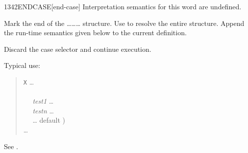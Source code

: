 \vspace*{-1.5ex}\enlargethispage{8ex}
\begin{worddef}{1342}{ENDCASE}[end-case]
\interpret
	Interpretation semantics for this word are undefined.

\compile

	Mark the end of the
	\ldots{}\ldots{}\ldots{}
	structure. Use  to resolve the entire structure.
	Append the run-time semantics given below to the current
	definition.

\runtime

	Discard the case selector  and continue execution.


	\begin{rationale} %
		Typical use:
		\begin{quote}
			\word{:} \texttt{X} {\ldots} \\
			\tab {} \\
			\tab~~ \emph{test1}  {\ldots}  \\
			\tab~~ \emph{testn}  {\ldots}  \\
			\tab~~ {\ldots}  default ) \\
			\tab {} {\ldots} \\
			\word{;}
		\end{quote}
	\end{rationale}

	\begin{testing}
		See .
	\end{testing}
\end{worddef}

